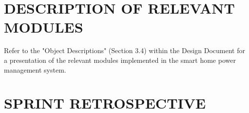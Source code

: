 \documentclass[10pt,twocolumn]{witseiepaper}
\begin{document}
	\section{DESCRIPTION OF RELEVANT MODULES}
	Refer to the "Object Descriptions" (Section 3.4) within the Design Document for a presentation of the relevant modules implemented in the smart home power management system. 
	\section{SPRINT RETROSPECTIVE}

	
	
	\newpage
	\pagebreak
	
	
	
	
\end{document}

